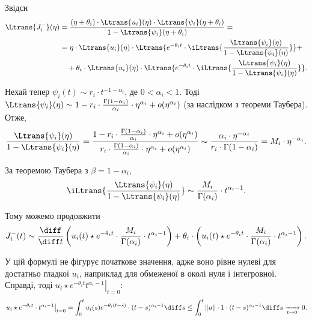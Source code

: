 Звідси
\begin{equation}
    \begin{aligned}
        \Ltrans{J_i^-}(\eta)
        &= \frac{(\eta + \theta_i) \cdot \Ltrans{u_i}(\eta) \cdot \Ltrans{\psi_i}(\eta + \theta_i)}{1 - \Ltrans{\psi_i}(\eta + \theta_i)} = \\
        &= \eta \cdot \Ltrans{u_i}(\eta) \cdot \Ltrans{e^{-\theta_i t} \cdot \iLtrans{\frac{\Ltrans{\psi_i}(\eta)}{1 - \Ltrans{\psi_i}(\eta)}}} + \\
        &\quad + \theta_i \cdot \Ltrans{u_i}(\eta) \cdot \Ltrans{e^{-\theta_i t} \cdot \iLtrans{\frac{\Ltrans{\psi_i}(\eta)}{1 - \Ltrans{\psi_i}(\eta)}}}.
    \end{aligned}
\end{equation}

Нехай тепер $\psi_i(t) \sim r_i \cdot t^{-1 - \alpha_i}$, де $0 < \alpha_i < 1$. Тоді $\Ltrans{\psi_i}(\eta) \sim 1 - r_i \cdot \frac{\Gamma(1 - \alpha_i)}{\alpha_i} \cdot \eta^{\alpha_i} + o(\eta^{\alpha_i})$ (за наслідком з теореми Таубера). Отже,
\begin{equation}
    \frac{\Ltrans{\psi_i}(\eta)}{1 - \Ltrans{\psi_i}(\eta)} = \frac{1 - r_i \cdot \frac{\Gamma(1 - \alpha_i)}{\alpha_i} \cdot \eta^{\alpha_i} + o(\eta^{\alpha_i})}{r_i \cdot \frac{\Gamma(1 - \alpha_i)}{\alpha_i} \cdot \eta^{\alpha_i} + o(\eta^{\alpha_i})} \sim \frac{\alpha_i \cdot \eta^{-\alpha_i}}{r_i \cdot \Gamma(1 - \alpha_i)} = M_i \cdot \eta^{-\alpha_i}.
\end{equation}

За теоремою Таубера з $\beta = 1 - \alpha_i$,
\begin{equation}
    \iLtrans{\frac{\Ltrans{\psi_i}(\eta)}{1 - \Ltrans{\psi_i}(\eta)}} \sim \frac{M_i}{\Gamma(\alpha_i)} \cdot t^{\alpha_i - 1}.
\end{equation}

Тому можемо продовжити
\begin{equation}
    J_i^-(t) \sim \frac{\diff}{\diff t} \left( u_i(t) \star e^{-\theta_i t} \cdot \frac{M_i}{\Gamma(\alpha_i)} \cdot t^{\alpha_i - 1} \right) + \theta_i \cdot \left( u_i(t) \star e^{-\theta_i t} \cdot \frac{M_i}{\Gamma(\alpha_i)} \cdot t^{\alpha_i - 1} \right).
\end{equation}

\begin{remark}
    У цій формулі не фігурує початкове значення, адже воно рівне нулеві для достатньо гладкої $u_i$, наприклад для обмеженої в околі нуля і інтегровної. Справді, тоді $\left. u_i \star e^{-\theta_i t} t^{\alpha_i - 1} \right|_{t = 0}$:
    \begin{equation}
        \left. u_i \star e^{-\theta_i t} \cdot t^{\alpha_i - 1} \right|_{t = 0} = \int_0^t u_i(s) e^{-\theta_i (t - s)} \cdot (t - s)^{\alpha_i - 1} \diff s \le \int_0^t \|u\| \cdot 1 \cdot (t - s)^{\alpha_i - 1} \diff s \xrightarrow[t \to 0]{} 0.
    \end{equation}
\end{remark}

